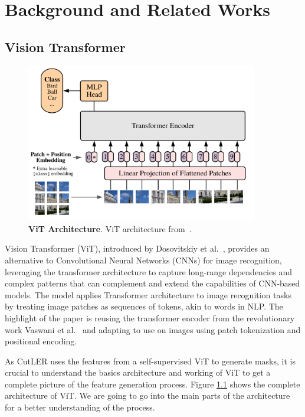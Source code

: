 \chapter{Background and Related Works}\label{chap:background}

\section{Vision Transformer}

\begin{figure}
	\centering
	\includegraphics[width=0.9\textwidth]{Images/main/vit_full_arch.png}
	\caption[\textbf{ViT Architecture}]{\textbf{ViT Architecture}. ViT architecture from~\cite{dosovitskiy2020image}.}
	\label{fig:vit_full_arch}
\end{figure}

Vision Transformer (ViT), introduced by Dosovitskiy et al.~\cite{dosovitskiy2020image}, provides an alternative to Convolutional Neural Networks (CNNs) for image recognition, leveraging the transformer architecture to capture long-range dependencies and complex patterns that can complement and extend the capabilities of CNN-based models. The model applies Transformer architecture to image recognition tasks by treating image patches as sequences of tokens, akin to words in NLP. The highlight of the paper is reusing the transformer encoder from the revolutionary work Vaswani et al.~\cite{vaswani2023attentionneed} and adapting to use on images using patch tokenization and positional encoding.

As CutLER uses the features from a self-supervised ViT to generate masks, it is crucial to understand the basics architecture and working of ViT to get a complete picture of the feature generation process. Figure \ref{fig:vit_full_arch} shows the complete architecture of ViT. We are going to go into the main parts of the architecture for a better understanding of the process.

